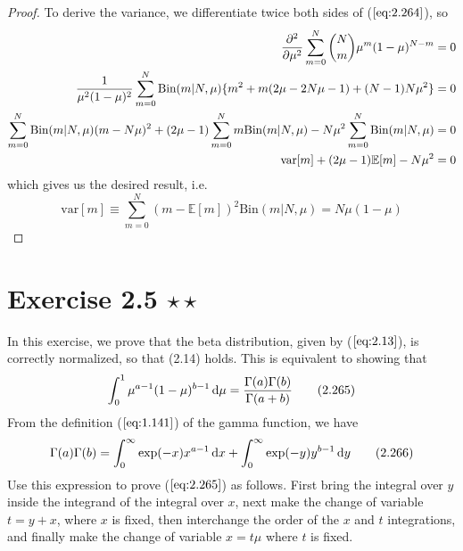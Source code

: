 \begin{proof}
    To derive the variance, we differentiate twice both sides
    of ($\ref{eq:2.264}$), so
    \begin{align*}
        \pdv[2]{\mu} \sum_{m=0}^{N} \binom{N}{m} \mu^m(1 - \mu)^{N - m} &= 0 \\
        \frac{1}{\mu^2(1 - \mu)^2} \sum_{m=0}^{N} \text{Bin}(m | N, \mu) 
            \{m^2 + m(2\mu - 2N\mu - 1) + (N - 1)N\mu^2\} &=0 \\
        \sum_{m=0}^{N} \text{Bin}(m | N, \mu) (m - N\mu)^2
            + (2\mu - 1)\sum_{m=0}^{N} m\text{Bin}(m | N, \mu)
            - N\mu^2 \sum_{m=0}^{N} \text{Bin}(m | N, \mu) &= 0 \\
        \text{var}[m] + (2\mu - 1)\mathbb{E}[m] - N\mu^2 &= 0
    \end{align*}
    which gives us the desired result, i.e.
    \begin{equation*}
        \text{var}[m] \equiv \sum_{m=0}^{N} (m - \mathbb{E}[m])^2 \text{Bin}(m | N, \mu) = N\mu(1 - \mu)
        \tag{2.12}\label{eq:2.12}
    \end{equation*}
\end{proof}

\section*{Exercise 2.5 $\star \star$}
In this exercise, we prove that the beta distribution, given by
($\ref{eq:2.13}$), is correctly normalized, so that (2.14) holds.
This is equivalent to showing that
\begin{equation*}
    \int_{0}^{1} \mu^{a-1}(1 - \mu)^{b - 1} \mathop{}\!\mathrm{d} \mu = \frac{\Gamma(a)\Gamma(b)}{\Gamma(a+b)}
    \tag{2.265}\label{eq:2.265}
\end{equation*}
From the definition ($\ref{eq:1.141}$) of the gamma function,
we have 
\begin{equation*}
    \Gamma(a)\Gamma(b) = \int_{0}^{\infty} \exp(-x)x^{a - 1} \mathop{}\!\mathrm{d} x +
    \int_{0}^{\infty} \exp(-y)y^{b - 1} \mathop{}\!\mathrm{d} y
    \tag{2.266}\label{eq:2.266}
\end{equation*}
Use this expression to prove ($\ref{eq:2.265}$) as follows. First
bring the integral over $y$ inside the integrand of the integral 
over $x$, next make the change of variable $t = y + x$, where $x$
is fixed, then interchange the order of the $x$ and $t$ integrations,
and finally make the change of variable $x = t\mu$ where $t$ is fixed. 

\vspace{1em}

